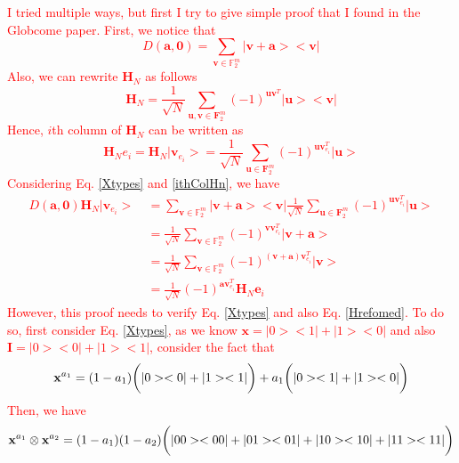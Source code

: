 \documentclass{article}
\begin{document}
\textcolor{red}{
	I tried multiple ways, but first I try to give simple proof that I found in the Globcome paper. First, we notice that 
	\begin{equation}\label{Xtypes}
		D\left(\mathbf{a}, \mathbf{0}\right) = \sum_{\mathbf{v} \in \mathbb{F}_2^m}{|\mathbf{v+a}><\mathbf{v}|}
	\end{equation} 
Also, we can rewrite $\mathbf{H}_N$ as follows
\begin{equation}\label{Hrefomed}
	\mathbf{H}_N = \frac{1}{\sqrt{N}} \sum_{\mathbf{u}, \mathbf{v} \in \mathbf{F}_2^m}{\left(-1\right)^{\mathbf{u} \mathbf{v}^T } |\mathbf{u}><\mathbf{v}|}
\end{equation}
Hence, $i$th column of $\mathbf{H}_N$ can be written as 
\begin{equation}\label{ithColHn}
	\mathbf{H}_N e_i = \mathbf{H}_N | \mathbf{v}_{e_i}> = \frac{1}{\sqrt{N}} \sum_{\mathbf{u} \in \mathbf{F}_2^m}{\left(-1\right)^{\mathbf{u} \mathbf{v}_{e_i}^T } |\mathbf{u}>}
\end{equation}
 Considering Eq. \eqref{Xtypes} and \eqref{ithColHn}, we have
\begin{align*}
	D\left(\mathbf{a}, \mathbf{0} \right) \mathbf{H}_N | \mathbf{v}_{e_i} > \: & = \sum_{\mathbf{v} \in \mathbb{F}_2^m}{|\mathbf{v+a}><\mathbf{v}|}  \frac{1}{\sqrt{N}} \sum_{\mathbf{u} \in \mathbf{F}_2^m}{\left(-1\right)^{\mathbf{u} \mathbf{v}_{e_i}^T } |\mathbf{u} > } \\
	& = \frac{1}{\sqrt{N}} \sum_{\mathbf{v} \in \mathbb{F}_2^m}{(-1)^{\mathbf{v}\mathbf{v}_{e_i}^T } |\mathbf{v+a}>} \\
	& = \frac{1}{\sqrt{N}} \sum_{\mathbf{v} \in \mathbb{F}_2^m}{(-1)^{\left(\mathbf{v+a}\right)\mathbf{v}_{e_i}^T } |\mathbf{v}>}\\
	& = \frac{1}{\sqrt{N}} (-1)^{\mathbf{a}\mathbf{v}_{e_i}^T} \mathbf{H}_N \mathbf{e}_i
\end{align*} 
However, this proof needs to verify Eq. \eqref{Xtypes} and also Eq. \eqref{Hrefomed}. To do so, first consider Eq. \eqref{Xtypes}, as we know $\mathbf{x} = |0><1| + |1><0|$ and also $\mathbf{I} = |0><0| + |1><1|$, consider the fact that 
\begin{equation*}
	 \mathbf{x}^{a_1}  = (1-a_1)\bigg{(}|0><0| + |1><1|\bigg{)}+a_1 \bigg{(} |0><1| + |1><0| \bigg{)}
\end{equation*}
Then, we have
\begin{align*}
	\mathbf{x}^{a_1} \otimes \mathbf{x}^{a_2} &= (1-a_1)(1-a_2)\bigg{(} |00><00|+|01><01|+|10><10|+|11><11| \bigg{)}\\

\end{align*}}
\end{document}
